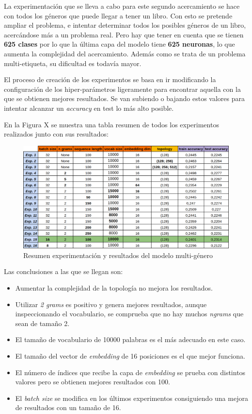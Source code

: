 \documentclass[12pt,a4paper, xcolor=table]{article}
\begin{document}
La experimentación que se lleva a cabo para este segundo acercamiento se hace con todos los géneros que puede llegar a tener un libro. Con esto se pretende ampliar el problema, e intentar determinar todos los posibles géneros de un libro, acercándose más a un problema real. Pero hay que tener en cuenta que se tienen \textbf{625 clases} por lo que la última capa del modelo tiene \textbf{625 neuronas}, lo que aumenta la complejidad del acercamiento. Además como se trata de un problema multi-etiqueta, su dificultad es todavía mayor.

\vspace{2mm}

El proceso de creación de los experimentos se basa en ir modificando la configuración de los hiper-parámetros ligeramente para encontrar aquella con la que se obtienen mejores resultados. Se van subiendo o bajando estos valores para intentar alcanzar un \textit{accuracy} en test lo más alto posible.

\vspace{1mm}

En la Figura X se muestra una tabla resumen de todos los experimentos realizados junto con sus resultados:


\begin{figure}[!h]
    \centering
    \includegraphics[width=500px]{img/multi.png}
    \caption{Resumen experimentación y resultados del modelo multi-género}
\end{figure}

Las conclusiones a las que se llegan son:

\begin{itemize}
  \item Aumentar la complejidad de la topología no mejora los resultados.
  \item Utilizar \textit{2 grams} es positivo y genera mejores resultados, aunque inspeccionando el vocabulario, se comprueba que no hay muchos \textit{ngrams} que sean de tamaño 2.
  \item El tamaño de vocabulario de 10000 palabras es el más adecuado en este caso.
  \item El tamaño del vector de \textit{embedding} de 16 posiciones es el que mejor funciona.
  \item El número de índices que recibe la capa de \textit{embedding} se prueba con distintos valores pero se obtienen mejores resultados con 100.
  \item El \textit{batch size} se modifica en los últimos experimentos consiguiendo una mejora de resultados con un tamaño de 16.
\end{itemize}
\end{document}
